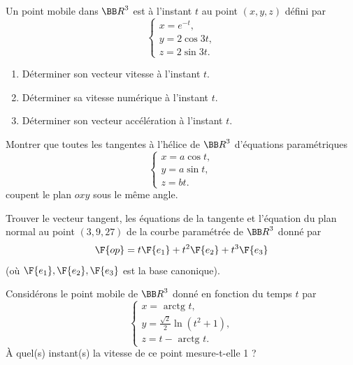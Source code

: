 \documentclass[12pt,french,oneside,a4paper]{memoir} %
\begin{document}
\begin{exo}
Un point mobile dans ${\BB R}^3$ est à l'instant $t$ au point $(x,y,z)$
défini par
\begin{equation*}
\left\{
\begin{array}{l}
x= e^{-t}, \\
y=2 \cos 3t, \\
z=2 \sin 3t.
\end{array}
\right.
\end{equation*}
\begin{enumerate}
\item Déterminer son vecteur vitesse à l'instant $t$.
\item Déterminer sa vitesse numérique à l'instant $t$.
\item Déterminer son vecteur accélération à l'instant $t$. 
\end{enumerate}
\end{exo}
\begin{exo}
Montrer que toutes les tangentes à l'hélice de ${\BB R}^3$ d'équations paramétriques
\begin{equation*}
\left\{
\begin{array}{l}
x = a \cos t, \\
y= a \sin t,  \\
z = bt.
\end{array}
\right.
\end{equation*}
coupent le plan $oxy$ sous le même angle.
\end{exo}

\begin{exo}
Trouver le vecteur tangent, les équations de la tangente et l'équation du
plan normal au point $(3,9,27)$ de la courbe paramétrée de ${\BB R}^3$ donné par
\begin{equation*}
\F{op} = t \F{e_1} + t^2 \F{e_2} + t^3 \F{e_3}
\end{equation*}
(où $\F{e_1}, \F{e_2}, \F{e_3}$ est la base canonique).
\end{exo}

\begin{exo}
Considérons le point mobile de ${\BB R}^3$ donné en fonction du temps $t$ par
\begin{equation*}
\left\{
\begin{array}{l}
x = \mbox{ arctg } t, \\
y = \displaystyle{\frac{\sqrt{2}}{2} \ln(t^2+1)}, \\
z=t - \mbox{ arctg } t.
\end{array}
\right.
\end{equation*}
À quel(s) instant(s) la vitesse de ce point mesure-t-elle 1 ?
\end{exo}
\end{document}
